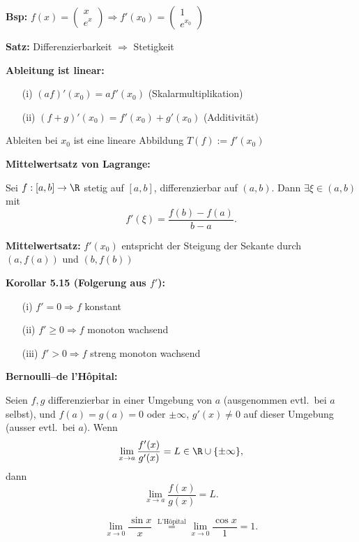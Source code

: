\textbf{Bsp:} \(f(x) = \begin{pmatrix} x \\ e^x \end{pmatrix} \Rightarrow f'(x_0) = \begin{pmatrix} 1 \\ e^{x_0} \end{pmatrix}\)

\textbf{Satz:}  
Differenzierbarkeit \(\Rightarrow\) Stetigkeit

\textbf{Ableitung ist linear:}
\begin{itemize}
  \item[(i)] \( (a f)'(x_0) = a f'(x_0) \) \quad (Skalarmultiplikation)
  \item[(ii)] \( (f + g)'(x_0) = f'(x_0) + g'(x_0) \) \quad (Additivität)
\end{itemize}
Ableiten bei \(x_0\) ist eine lineare Abbildung \(T(f) := f'(x_0)\)

\textbf{Mittelwertsatz von Lagrange:}
\begin{theorem}
  Sei $f:[a,b]\to\R$ stetig auf $[a,b]$, differenzierbar auf $(a,b)$. Dann $\exists\xi\in(a,b)$ mit
  \[
    f'(\xi) = \frac{f(b)-f(a)}{b-a}.
  \]
\end{theorem}

\textbf{Mittelwertsatz:}  
\(f'(x_0)\) entspricht der Steigung der Sekante durch \((a, f(a))\) und \((b, f(b))\)

\textbf{Korollar 5.15 (Folgerung aus \(f'\)):}
\begin{itemize}
  \item[(i)] \(f' = 0 \Rightarrow f\) konstant
  \item[(ii)] \(f' \ge 0 \Rightarrow f\) monoton wachsend
  \item[(iii)] \(f' > 0 \Rightarrow f\) streng monoton wachsend
\end{itemize}


\textbf{Bernoulli–de l’Hôpital:}
\begin{theorem}
  Seien $f,g$ differenzierbar in einer Umgebung von $a$ (ausgenommen evtl.\ bei $a$ selbst), und $f(a)=g(a)=0$ oder $\pm\infty$, $g'(x)\ne0$ auf dieser Umgebung (ausser evtl.\ bei $a$). Wenn
  \[
    \lim_{x\to a} \frac{f'(x)}{g'(x)} = L \in \R \cup \{\pm\infty\},
  \]
  dann
  \[
    \lim_{x\to a} \frac{f(x)}{g(x)} = L.
  \]
\end{theorem}
\begin{example}
  \[
    \lim_{x\to0} \frac{\sin x}{x} 
    \;\stackrel{\text{L'Hôpital}}= 
    \lim_{x\to0} \frac{\cos x}{1} = 1.
  \]
\end{example}

